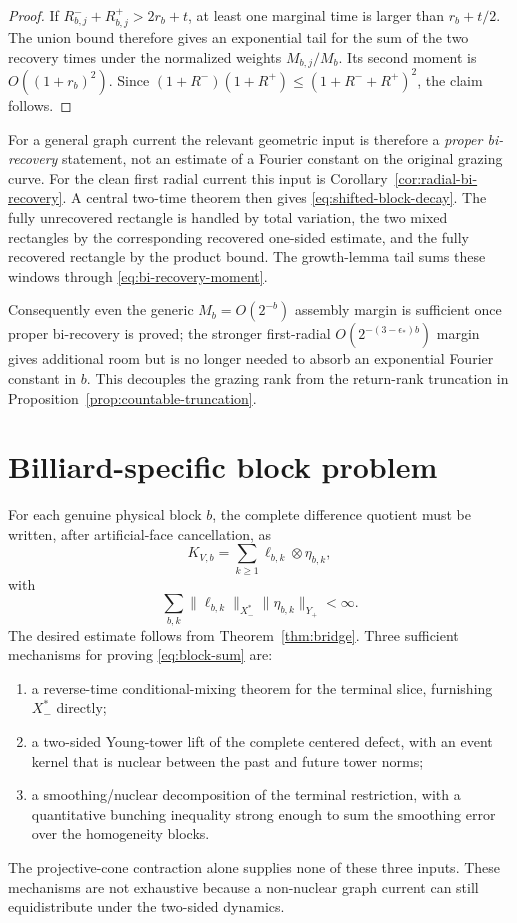 \documentclass[11pt]{article}
\begin{document}
\begin{proof}
If $R_{b,j}^-+R_{b,j}^+>2r_b+t$, at least one marginal time is larger than
$r_b+t/2$.  The union bound therefore gives an exponential tail for the sum
of the two recovery times under the normalized weights $M_{b,j}/M_b$.
Its second moment is $O((1+r_b)^2)$.  Since
$(1+R^-)(1+R^+)\le(1+R^-+R^+)^2$, the claim follows.
\end{proof}

For a general graph current the relevant geometric input is therefore a
\emph{proper bi-recovery} statement, not an estimate of a Fourier constant on
the original grazing curve.  For the clean first radial current this input is
Corollary~\ref{cor:radial-bi-recovery}.  A central two-time theorem then gives
\eqref{eq:shifted-block-decay}.  The fully unrecovered rectangle is handled by
total variation, the two mixed rectangles by the corresponding recovered
one-sided estimate, and the fully recovered rectangle by the product bound.
The growth-lemma tail sums these windows through
\eqref{eq:bi-recovery-moment}.

Consequently even the generic $M_b=O(2^{-b})$ assembly margin is sufficient
once proper bi-recovery is proved; the stronger first-radial
$O(2^{-(3-\epsilon_*)b})$ margin gives additional room but is no longer
needed to absorb an exponential Fourier constant in $b$.  This decouples the
grazing rank from the return-rank truncation in
Proposition~\ref{prop:countable-truncation}.

\section{Billiard-specific block problem}

For each genuine physical block $b$, the complete difference quotient must be
written, after artificial-face cancellation, as
\begin{equation}
\label{eq:block-kernel}
 K_{V,b}=\sum_{k\ge1}\ell_{b,k}\otimes\eta_{b,k},
\end{equation}
with
\begin{equation}
\label{eq:block-sum}
 \sum_{b,k}\|\ell_{b,k}\|_{X_-^*}
             \|\eta_{b,k}\|_{Y_+}<\infty.
\end{equation}
The desired estimate follows from Theorem~\ref{thm:bridge}.  Three sufficient
mechanisms for proving \eqref{eq:block-sum} are:
\begin{enumerate}[label=\textup{(\roman*)}]
\item a reverse-time conditional-mixing theorem for the terminal slice,
      furnishing $X_-^*$ directly;
\item a two-sided Young-tower lift of the complete centered defect, with an
      event kernel that is nuclear between the past and future tower norms;
\item a smoothing/nuclear decomposition of the terminal restriction, with a
      quantitative bunching inequality strong enough to sum the smoothing
      error over the homogeneity blocks.
\end{enumerate}
The projective-cone contraction alone supplies none of these three inputs.
These mechanisms are not exhaustive because a non-nuclear graph current can
still equidistribute under the two-sided dynamics.
\end{document}
